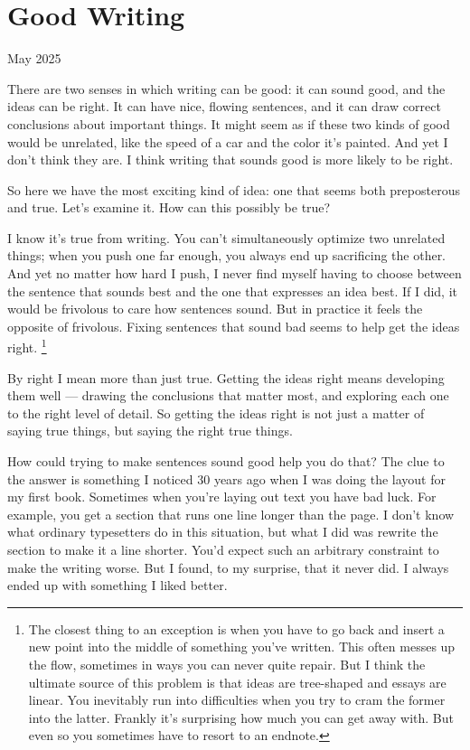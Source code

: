 \chapter{Good Writing}

May 2025

There are two senses in which writing can be good: it can sound good,
and the ideas can be right. It can have nice, flowing sentences, and it
can draw correct conclusions about important things. It might seem as if
these two kinds of good would be unrelated, like the speed of a car and
the color it's painted. And yet I don't think they are. I think writing
that sounds good is more likely to be right.

So here we have the most exciting kind of idea: one that seems both
preposterous and true. Let's examine it. How can this possibly be true?

I know it's true from writing. You can't simultaneously optimize two
unrelated things; when you push one far enough, you always end up
sacrificing the other. And yet no matter how hard I push, I never find
myself having to choose between the sentence that sounds best and the
one that expresses an idea best. If I did, it would be frivolous to care
how sentences sound. But in practice it feels the opposite of frivolous.
Fixing sentences that sound bad seems to help get the ideas right.
\footnote{The closest thing to an exception is when you have to go back
and insert a new point into the middle of something you've written. This
often messes up the flow, sometimes in ways you can never quite repair.
But I think the ultimate source of this problem is that ideas are
tree-shaped and essays are linear. You inevitably run into difficulties
when you try to cram the former into the latter. Frankly it's surprising
how much you can get away with. But even so you sometimes have to resort
to an endnote.}

By right I mean more than just true. Getting the ideas right means
developing them well --- drawing the conclusions that matter most, and
exploring each one to the right level of detail. So getting the ideas
right is not just a matter of saying true things, but saying the right
true things.

How could trying to make sentences sound good help you do that? The clue
to the answer is something I noticed 30 years ago when I was doing the
layout for my first book. Sometimes when you're laying out text you have
bad luck. For example, you get a section that runs one line longer than
the page. I don't know what ordinary typesetters do in this situation,
but what I did was rewrite the section to make it a line shorter. You'd
expect such an arbitrary constraint to make the writing worse. But I
found, to my surprise, that it never did. I always ended up with
something I liked better.

